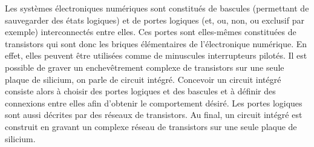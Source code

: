 Les systèmes électroniques numériques sont constitués de bascules (permettant de
sauvegarder des états logiques) et de portes logiques (et, ou, non, ou exclusif par
exemple) interconnectés entre elles. Ces portes sont elles-mêmes constituées de
transistors qui sont donc les briques élémentaires de l'électronique numérique. En
effet, elles peuvent être utilisées comme de minuscules interrupteurs pilotés. Il est
possible de graver un enchevêtrement complexe de transistors sur une seule plaque de
silicium, on parle de circuit intégré.  Concevoir un circuit intégré consiste alors à
choisir des portes logiques et des bascules et à définir des connexions entre elles
afin d'obtenir le comportement désiré.  Les portes logiques sont aussi décrites par
des réseaux de transistors.  Au final, un circuit intégré est construit en gravant un
complexe réseau de transistors sur une seule plaque de silicium.


